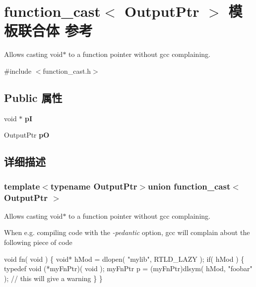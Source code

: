 \hypertarget{unionfunction__cast}{\section{function\+\_\+cast$<$ Output\+Ptr $>$ 模板联合体 参考}
\label{unionfunction__cast}
}


Allows casting void$\ast$ to a function pointer without gcc complaining.  




{\ttfamily \#include $<$function\+\_\+cast.\+h$>$}

\subsection*{Public 属性}
\begin{DoxyCompactItemize}
\item 
\hypertarget{unionfunction__cast_a82d3e25e49fe39a76873688699f41420}{void $\ast$ {\bfseries p\+I}}\label{unionfunction__cast_a82d3e25e49fe39a76873688699f41420}

\item 
\hypertarget{unionfunction__cast_aff8ea61f61f2f5b90af9d08b763ef8c2}{Output\+Ptr {\bfseries p\+O}}\label{unionfunction__cast_aff8ea61f61f2f5b90af9d08b763ef8c2}

\end{DoxyCompactItemize}


\subsection{详细描述}
\subsubsection*{template$<$typename Output\+Ptr$>$union function\+\_\+cast$<$ Output\+Ptr $>$}

Allows casting void$\ast$ to a function pointer without gcc complaining. 

When e.\+g. compiling code with the {\itshape -\/pedantic} option, gcc will complain about the following piece of code


\begin{DoxyCode}
\textcolor{keywordtype}{void} fn( \textcolor{keywordtype}{void} )
\{
  \textcolor{keywordtype}{void}* hMod = dlopen( \textcolor{stringliteral}{"mylib"}, RTLD\_LAZY );
  \textcolor{keywordflow}{if}( hMod )
  \{
    \textcolor{keyword}{typedef} void (*myFnPtr)( void );
    myFnPtr p = (myFnPtr)dlsym( hMod, \textcolor{stringliteral}{"foobar"} ); \textcolor{comment}{// this will give a warning}
  \}
\}
\end{DoxyCode}


